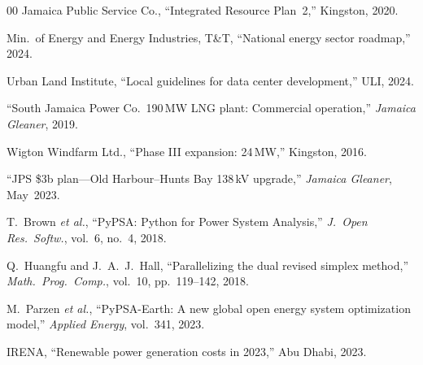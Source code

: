 \documentclass[conference,10pt]{IEEEtran}
\begin{document}
\begin{thebibliography}{00}
 Jamaica Public Service Co., ``Integrated Resource Plan~2,'' Kingston, 2020.

 Min.\ of Energy and Energy Industries, T\&T, ``National energy sector roadmap,'' 2024.

 Urban Land Institute, ``Local guidelines for data center development,'' ULI, 2024.

 ``South Jamaica Power Co.\ 190\,MW LNG plant: Commercial operation,'' \textit{Jamaica Gleaner}, 2019.

 Wigton Windfarm Ltd., ``Phase III expansion: 24\,MW,'' Kingston, 2016.

 ``JPS \$3b plan---Old Harbour--Hunts Bay 138\,kV upgrade,'' \textit{Jamaica Gleaner}, May~2023.

 T.~Brown \textit{et al.}, ``PyPSA: Python for Power System Analysis,'' \textit{J.~Open Res.~Softw.}, vol.~6, no.~4, 2018.

 Q.~Huangfu and J.~A.~J.~Hall, ``Parallelizing the dual revised simplex method,'' \textit{Math.\ Prog.\ Comp.}, vol.~10, pp.~119--142, 2018.

 M.~Parzen \textit{et al.}, ``PyPSA-Earth: A new global open energy system optimization model,'' \textit{Applied Energy}, vol.~341, 2023.

 IRENA, ``Renewable power generation costs in 2023,'' Abu Dhabi, 2023.

\end{thebibliography}
\end{document}
